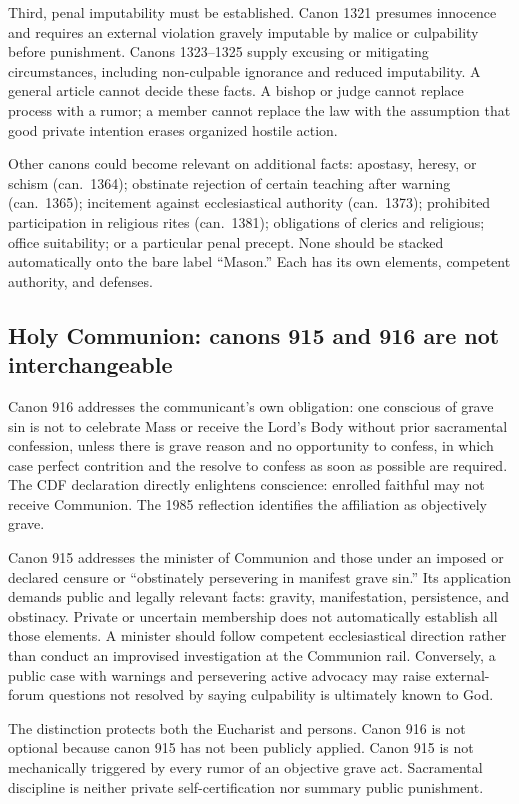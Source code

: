 Third, penal imputability must be established. Canon 1321 presumes innocence and requires an external violation gravely imputable by malice or culpability before punishment. Canons 1323--1325 supply excusing or mitigating circumstances, including non-culpable ignorance and reduced imputability. A general article cannot decide these facts. A bishop or judge cannot replace process with a rumor; a member cannot replace the law with the assumption that good private intention erases organized hostile action.

Other canons could become relevant on additional facts: apostasy, heresy, or schism (can.~1364); obstinate rejection of certain teaching after warning (can.~1365); incitement against ecclesiastical authority (can.~1373); prohibited participation in religious rites (can.~1381); obligations of clerics and religious; office suitability; or a particular penal precept. None should be stacked automatically onto the bare label “Mason.” Each has its own elements, competent authority, and defenses.

\subsection{Holy Communion: canons 915 and 916 are not interchangeable}

Canon 916 addresses the communicant's own obligation: one conscious of grave sin is not to celebrate Mass or receive the Lord's Body without prior sacramental confession, unless there is grave reason and no opportunity to confess, in which case perfect contrition and the resolve to confess as soon as possible are required. The CDF declaration directly enlightens conscience: enrolled faithful may not receive Communion. The 1985 reflection identifies the affiliation as objectively grave.

Canon 915 addresses the minister of Communion and those under an imposed or declared censure or “obstinately persevering in manifest grave sin.” Its application demands public and legally relevant facts: gravity, manifestation, persistence, and obstinacy. Private or uncertain membership does not automatically establish all those elements. A minister should follow competent ecclesiastical direction rather than conduct an improvised investigation at the Communion rail. Conversely, a public case with warnings and persevering active advocacy may raise external-forum questions not resolved by saying culpability is ultimately known to God.

The distinction protects both the Eucharist and persons. Canon 916 is not optional because canon 915 has not been publicly applied. Canon 915 is not mechanically triggered by every rumor of an objective grave act. Sacramental discipline is neither private self-certification nor summary public punishment.

